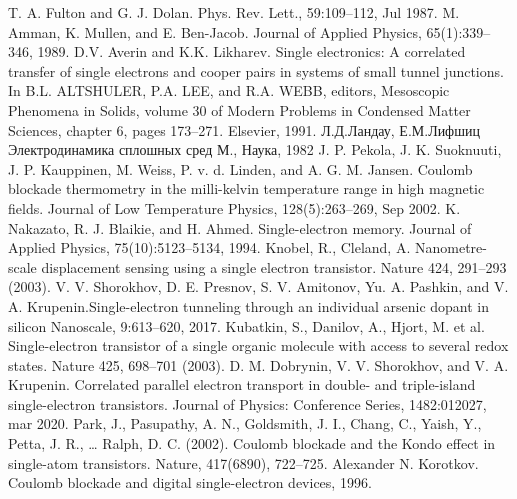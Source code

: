 \documentclass[12pt,a4paper]{report}
\begin{document}
\renewcommand\bibname{Cписок литературы}
\begin{thebibliography}{99}
	 T. A. Fulton and G. J. Dolan. Phys. Rev. Lett., 59:109–112, Jul 1987.
	M. Amman, K. Mullen, and E. Ben-Jacob. Journal of Applied Physics, 65(1):339–346,
1989.
	D.V. Averin and K.K. Likharev. Single electronics: A correlated transfer of single
electrons and cooper pairs in systems of small tunnel junctions. In B.L. ALTSHULER,
P.A. LEE, and R.A. WEBB, editors, Mesoscopic Phenomena in Solids, volume 30 of
Modern Problems in Condensed Matter Sciences, chapter 6, pages 173–271. Elsevier,
1991.
	Л.Д.Ландау, Е.М.Лифшиц Электродинамика сплошных сред М., Наука, 1982
	 J. P. Pekola, J. K. Suoknuuti, J. P. Kauppinen, M. Weiss, P. v. d. Linden, and A. G. M.
Jansen. Coulomb blockade thermometry in the milli-kelvin temperature range in high
magnetic fields. Journal of Low Temperature Physics, 128(5):263–269, Sep 2002.
	 K. Nakazato, R. J. Blaikie, and H. Ahmed. Single-electron memory. Journal of Applied
Physics, 75(10):5123–5134, 1994.
	 Knobel, R., Cleland, A. Nanometre-scale displacement sensing using a single electron transistor. Nature 424, 291–293 (2003).
	 V. V. Shorokhov, D. E. Presnov, S. V. Amitonov, Yu. A. Pashkin, and V. A. Krupenin.Single-electron tunneling through an individual arsenic dopant in silicon
Nanoscale, 9:613–620, 2017.
	 Kubatkin, S., Danilov, A., Hjort, M. et al. Single-electron transistor of a single organic molecule with access to several redox states. Nature 425, 698–701 (2003).
	 D. M. Dobrynin, V. V. Shorokhov, and V. A. Krupenin. Correlated parallel electron
transport in double- and triple-island single-electron transistors. Journal of Physics:
Conference Series, 1482:012027, mar 2020.
	 Park, J., Pasupathy, A. N., Goldsmith, J. I., Chang, C., Yaish, Y., Petta, J. R., … Ralph, D. C. (2002). Coulomb blockade and the Kondo effect in single-atom transistors. Nature, 417(6890), 722–725.
	 Alexander N. Korotkov. Coulomb blockade and digital single-electron devices, 1996.
\end{thebibliography}
\end{document}
